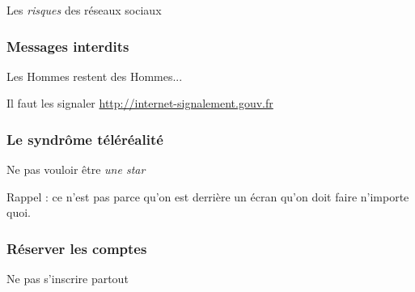 \documentclass{beamer}
\begin{document}
\begin{frame}
\begin{center}
\Huge{Les \emph{risques} des réseaux sociaux}
\end{center}
\end{frame}

\begin{frame}
\frametitle{Messages interdits}

\begin{block}{Les Hommes restent des Hommes...} 
\end{block}
Il faut les signaler \url{http://internet-signalement.gouv.fr}
\end{frame}

\begin{frame}
\frametitle{Le syndrôme téléréalité}

\begin{block}{Ne pas vouloir être \emph{une star}}
\begin{itemize}
\end{itemize}
\end{block}
Rappel : ce n'est pas parce qu'on est derrière un écran qu'on doit faire n'importe quoi.
\end{frame}

\begin{frame}
\frametitle{Réserver les comptes}

\begin{block}{Ne pas s'inscrire partout}
\begin{itemize}
\end{itemize}
\end{block}
\end{frame}
\end{document}
